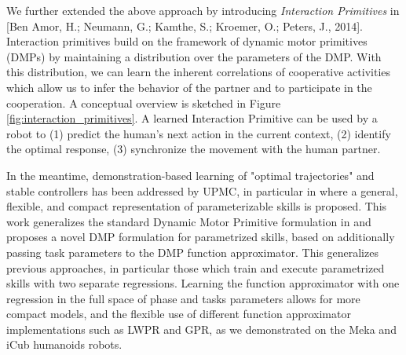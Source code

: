We further extended the above approach by introducing \emph{Interaction Primitives} in [Ben Amor, H.; Neumann, G.; Kamthe, S.; Kroemer, O.; Peters, J., 2014]. Interaction primitives build on the framework of dynamic motor primitives (DMPs) by maintaining a distribution over the parameters of the DMP. With this distribution, we can learn the inherent correlations of cooperative activities which allow us to infer the behavior of the partner and to participate in the cooperation. A conceptual overview is sketched in Figure \ref{fig:interaction_primitives}. A learned Interaction Primitive can be used by a robot to (1) predict the human's next action in the current context, (2) identify the optimal response, (3) synchronize the movement with the human partner.

In the meantime, demonstration-based learning of "optimal trajectories" and stable controllers has been addressed by UPMC, in particular in \cite{stulp2013} where a general, flexible, and compact representation of parameterizable skills is proposed. This work generalizes the standard Dynamic Motor Primitive formulation in \cite{ijspeert2013} and proposes a novel DMP formulation for parametrized skills, based on additionally passing task parameters to the DMP function approximator. This generalizes previous approaches, in particular those which train and execute parametrized skills with two separate regressions. Learning the function approximator with one regression in the full space of phase and tasks parameters allows for more compact models, and the flexible use of different function approximator implementations such as LWPR and GPR, as we demonstrated on the Meka and iCub humanoids robots.
